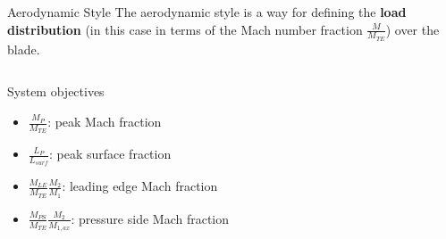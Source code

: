 \begin{frame}{Aerodynamic Style}
    The aerodynamic style is a way for defining the \textbf{load distribution} (in this case in terms of the Mach number fraction $\frac{M}{M_{TE}}$) over the blade.
    \begin{columns}
        \begin{block}{System objectives}
            \begin{itemize}
                \setlength\itemsep{0.3cm}
                \item $\frac{M_P}{M_{TE}}$: peak Mach fraction
                \item $\frac{L_P}{L_{surf}}$: peak surface fraction
                \item $\frac{M_{LE}}{M_{TE}}\frac{M_2}{M_1}$: leading edge Mach fraction
                \item $\frac{M_{PS}}{M_{TE}}\frac{M_2}{M_{1, ax}}$: pressure side Mach fraction
            \end{itemize}
        \end{block}
            \vspace{-2cm}
            \begin{figure}
                \centering
            \end{figure}
    \end{columns}
\end{frame}